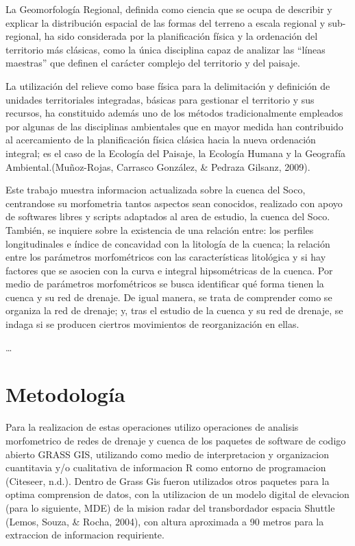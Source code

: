 \documentclass[11pt,]{article}
\begin{document}
La Geomorfología Regional, definida como ciencia que se ocupa de
describir y explicar la distribución espacial de las formas del terreno
a escala regional y sub-regional, ha sido considerada por la
planificación física y la ordenación del territorio más clásicas, como
la única disciplina capaz de analizar las ``líneas maestras'' que
definen el carácter complejo del territorio y del paisaje.

La utilización del relieve como base física para la delimitación y
definición de unidades territoriales integradas, básicas para gestionar
el territorio y sus recursos, ha constituido además uno de los métodos
tradicionalmente empleados por algunas de las disciplinas ambientales
que en mayor medida han contribuido al acercamiento de la planificación
física clásica hacia la nueva ordenación integral; es el caso de la
Ecología del Paisaje, la Ecología Humana y la Geografía
Ambiental.(Muñoz-Rojas, Carrasco González, \& Pedraza Gilsanz, 2009).

Este trabajo muestra informacion actualizada sobre la cuenca del Soco,
centrandose su morfometria tantos aspectos sean conocidos, realizado con
apoyo de softwares libres y scripts adaptados al area de estudio, la
cuenca del Soco. También, se inquiere sobre la existencia de una
relación entre: los perfiles longitudinales e índice de concavidad con
la litología de la cuenca; la relación entre los parámetros
morfométricos con las características litológica y si hay factores que
se asocien con la curva e integral hipsométricas de la cuenca. Por medio
de parámetros morfométricos se busca identificar qué forma tienen la
cuenca y su red de drenaje. De igual manera, se trata de comprender como
se organiza la red de drenaje; y, tras el estudio de la cuenca y su red
de drenaje, se indaga si se producen ciertros movimientos de
reorganización en ellas.

\ldots

\section{Metodología}\label{metodologuxeda}

Para la realizacion de estas operaciones utilizo operaciones de analisis
morfometrico de redes de drenaje y cuenca de los paquetes de software de
codigo abierto GRASS GIS, utilizando como medio de interpretacion y
organizacion cuantitavia y/o cualitativa de informacion R como entorno
de programacion (Citeseer, n.d.). Dentro de Grass Gis fueron utilizados
otros paquetes para la optima comprension de datos, con la utilizacion
de un modelo digital de elevacion (para lo siguiente, MDE) de la mision
radar del transbordador espacia Shuttle (Lemos, Souza, \& Rocha, 2004),
con altura aproximada a 90 metros para la extraccion de informacion
requiriente.
\end{document}
